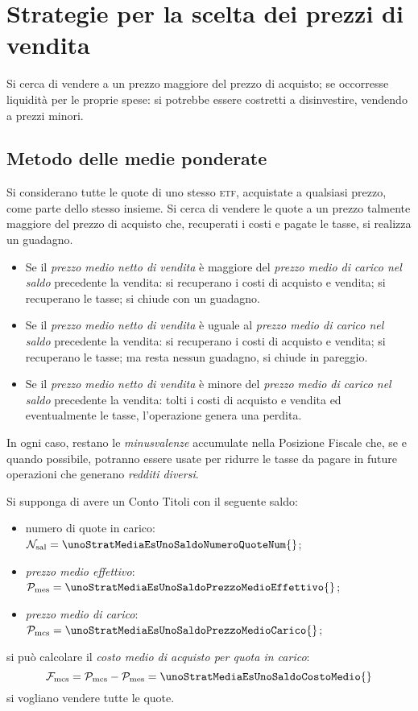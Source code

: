 \documentclass[12pt,a4paper]{article}
\newcommand{\Etf}[1]{\textsc{etf}}
\newcommand{\Nsal}[1]{\mathcal{N}_{\textrm{sal}#1}}
\newcommand{\Pme}[1]{\mathcal{P}_{\mathrm{me}#1}}
\newcommand{\Pmes}[1]{\Pme{\mathrm{s}#1}}
\newcommand{\Pmc}[1]{\mathcal{P}_{\mathrm{mc}#1}}
\newcommand{\Pmcs}[1]{\Pmc{\mathrm{s}#1}}
\newcommand{\Fmcs}[1]{\mathcal{F}_{\mathrm{mcs}#1}}
\begin{document}

\section{Strategie per la scelta dei prezzi di vendita}


Si cerca  di vendere a  un prezzo maggiore  del prezzo di acquisto;  se occorresse liquidità  per le
proprie spese: si potrebbe essere costretti a disinvestire, vendendo a prezzi minori.


\subsection{Metodo delle medie ponderate}




Si considerano tutte le quote di uno stesso  \Etf{}, acquistate a qualsiasi prezzo, come parte dello
stesso insieme.  Si cerca  di vendere le quote a un prezzo talmente  maggiore del prezzo di acquisto
che, recuperati i costi e pagate le tasse, si realizza un guadagno.
\begin{itemize}
\item Se  il \emph{prezzo medio netto  di vendita} è maggiore  del \emph{prezzo medio di  carico nel
     saldo} precedente  la vendita: si recuperano  i costi di  acquisto e vendita; si  recuperano le
  tasse; si chiude con un guadagno.

\item Se il \emph{prezzo medio netto di vendita} è uguale al \emph{prezzo medio di carico nel saldo}
  precedente la  vendita: si recuperano i  costi di acquisto e  vendita; si recuperano le  tasse; ma
  resta nessun guadagno, si chiude in pareggio.

\item Se  il \emph{prezzo  medio netto di  vendita} è  minore del \emph{prezzo  medio di  carico nel
     saldo} precedente la  vendita: tolti i costi  di acquisto e vendita ed  eventualmente le tasse,
  l'operazione genera una perdita.
\end{itemize}
In ogni  caso, restano le  \emph{minusvalenze} accumulate nella Posizione  Fiscale che, se  e quando
possibile, potranno essere  usate per ridurre le  tasse da pagare in future  operazioni che generano
\emph{redditi diversi}.

Si supponga di avere un Conto Titoli con il seguente saldo:
\begin{itemize}
\item numero di quote in carico:
  \(\Nsal{} = \unoStratMediaEsUnoSaldoNumeroQuoteNum{}\);
\item \emph{prezzo medio effettivo}:
  \(\Pmes{} = \unoStratMediaEsUnoSaldoPrezzoMedioEffettivo{}\);
\item \emph{prezzo medio di carico}:
  \(\Pmcs{} = \unoStratMediaEsUnoSaldoPrezzoMedioCarico{}\);
\end{itemize}
si può calcolare il \emph{costo medio di acquisto per quota in carico}:
\begin{equation*}
  \Fmcs{} = \Pmcs{} - \Pmes{} = \unoStratMediaEsUnoSaldoCostoMedio{}
\end{equation*}
si vogliano vendere tutte le quote.
\end{document}
